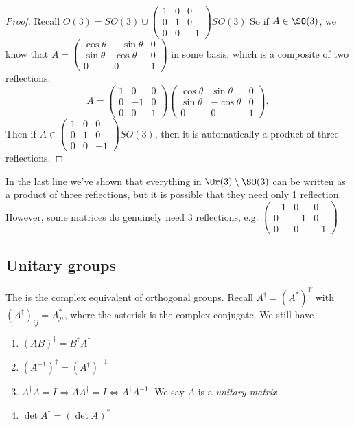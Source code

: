 \documentclass[a4paper]{article}
\begin{document}
  \begin{proof}
    Recall $O(3) = SO(3) \cup 
    \begin{pmatrix}
      1 & 0 & 0\\
      0 & 1 & 0\\
      0 & 0 & -1
    \end{pmatrix}SO(3)$
    So if $A\in \SO(3)$, we know that $A = 
    \begin{pmatrix}
      \cos\theta & -\sin\theta & 0\\
      \sin\theta & \cos\theta & 0\\
      0 & 0 & 1
    \end{pmatrix}$ in some basis, which is a composite of two reflections:
    \[
      A = 
      \begin{pmatrix}
        1 & 0 & 0\\
        0 & -1 & 0\\
        0 & 0 & 1
      \end{pmatrix}
      \begin{pmatrix}
        \cos\theta & \sin\theta & 0\\
        \sin\theta & -\cos\theta & 0\\
        0 & 0 & 1
      \end{pmatrix},
    \]
    Then if $A\in \begin{pmatrix}
      1 & 0 & 0\\
      0 & 1 & 0\\
      0 & 0 & -1
    \end{pmatrix}SO(3)$, then it is automatically a product of three reflections.
  \end{proof}
  \note In the last line we've shown that everything in $\Or(3)\setminus \SO(3)$ can be written as a product of three reflections, but it is possible that they need only 1 reflection. However, some matrices do genuinely need 3 reflections, e.g.
  $\begin{pmatrix}
    -1 & 0 & 0\\
    0 & -1 & 0\\
    0 & 0 & -1
  \end{pmatrix}$

  \subsection{Unitary groups}
  The is the complex equivalent of orthogonal groups. Recall $A^\dagger = (A^*)^T$ with $(A^\dagger)_{ij} = A_{ji}^*$, where the asterisk is the complex conjugate. We still have
  \begin{enumerate}
    \item $(AB)^\dagger = B^\dagger A^\dagger$
    \item $(A^{-1})^\dagger = (A^\dagger)^{-1}$
    \item $A^\dagger A = I \Leftrightarrow AA^\dagger = I \Leftrightarrow A^\dagger A^{-1}$. We say $A$ is a \emph{unitary matrix}
    \item $\det A^{\dagger} = (\det A)^*$
  \end{enumerate}
\end{document}
